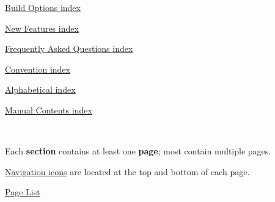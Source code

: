 \begin{TabularC}{2}
\begin{DoxyItemize}
\item \hyperlink{O_Contents_Page_BuildingOptions_section_index}{Build Options index} 
\item \hyperlink{O_Contents_Page_NDF_section_index}{New Features index} 
\item \hyperlink{O_Contents_Page_FAQ_section_index}{Frequently Asked Questions index} 
\item \hyperlink{O_Contents_Page_Convention_section_index}{Convention index} 
\item \hyperlink{O_Contents_Page_DocIndex_section_index}{Alphabetical index} 
\item \hyperlink{O_Contents_Page}{Manual Contents index} 
\end{DoxyItemize}\\
\end{TabularC}
\par
 
\begin{DoxyItemize}
\item Each {\bfseries  section } contains at least one {\bfseries  page}; most contain multiple pages. 
\item \hyperlink{Convention_C_Navigation}{Navigation icons} are located at the top and bottom of each page. 
\item \hyperlink{O_Contents_Page}{Page List} 
\end{DoxyItemize}\label{index_end}
\hypertarget{index_end}{}
  \par
 